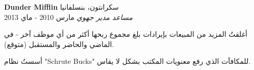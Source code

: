\foreignlanguage{english}{\textbf{Dunder Mifflin}} \hfill سكرانتون، بنسلفانيا\\
\textit{مساعد مدير جهوي} \hfill مارس 2010 - ماي 2013\\
\vspace*{-4pt}
\begin{achievements}
	\item أغلقتُ المزيد من المبيعات بإيرادات بلغ مجموع ربحها أكثر من أي موظف آخر - في الماضي والحاضر والمستقبل (متوقع).
	\item أسستُ نظام \foreignlanguage{english}{"Schrute Bucks"} للمكافآت الذي رفع معنويات المكتب بشكل لا يقاس.
\end{achievements}
